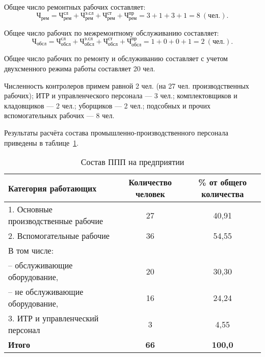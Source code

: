 \vspace{-3mm}
Общее число ремонтных рабочих составляет:
\begin{equation*}
  \text{Ч}_{\text{рем}} = 
  \text{Ч}^{\text{сл}}_{\text{рем}} + \text{Ч}^{\text{э.сл}}_{\text{рем}} +
  \text{Ч}^{\text{ст}}_{\text{рем}} + \text{Ч}^{\text{пр}}_{\text{рем}} =
  3 + 1 + 3 + 1 = 8 \: (\text{чел.}).
\end{equation*}

Общее число рабочих по межремонтному обслуживанию составляет:
\begin{equation*}
  \text{Ч}_{\text{обсл}} = 
  \text{Ч}^{\text{сл}}_{\text{обсл}} + \text{Ч}^{\text{э.сл}}_{\text{обсл}} +
  \text{Ч}^{\text{ст}}_{\text{обсл}} + \text{Ч}^{\text{пр}}_{\text{обсл}} =
  1 + 0 + 0 + 1 = 2 \: (\text{чел.}).
\end{equation*}

Общее число рабочих по ремонту и обслуживанию составляет с учетом
двухсменного режима работы составляет 20 чел.

Численность контролеров примем равной 2 чел. 
(на 27 чел. производственных рабочих);
ИТР и управленческого персонала --- 3 чел.;
комплектовщиков и кладовщиков --- 2 чел.;
уборщиков --- 2 чел.;
подсобных и прочих вспомогательных рабочих --- 8 чел.

Результаты расчёта состава промышленно-производственного персонала
приведены в таблице~\ref{tbl:number}.

\begin{table} [h!]
  \caption{
    Состав ППП на предприятии
  }\label{tbl:number}
    \begin{tabular}{| m{9cm} | c | c |}
      \hline
        \parbox{9cm}{
          \smallskip
          \centering Категория работающих
          \smallskip
        }
      & \parbox{2.8cm}{
          \smallskip
          \centering Количество человек
          \smallskip
        }
      & \parbox{3.3cm}{
          \smallskip
          \centering \% от общего количества
          \smallskip
        } \\
      \hline

      1. Основные производственные рабочие & 27 & 40{,}91 \\
      \hline

      2. Вспомогательные рабочие & 36 & 54{,}55 \\

      В том числе: & & \\
      -- обслуживающие оборудование, & 20 & 30{,}30 \\
      -- не обслуживающие оборудование, & 16 & 24{,}24 \\
      \hline

      3. ИТР и управленческий персонал & 3 & 4{,}55 \\
      \hline

      \raggedleft \textbf{Итого} & \textbf{66} & \textbf{100{,}0} \\
      \hline
    \end{tabular}
\end{table}